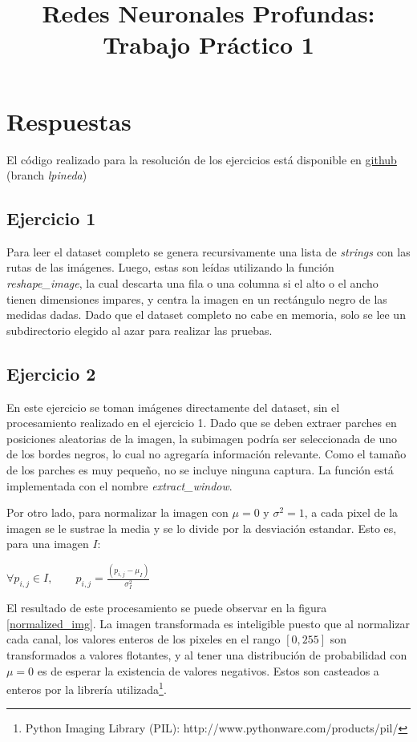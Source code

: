 \documentclass[11pt,spanish]{article}
\begin{document}
\title{Redes Neuronales Profundas: Trabajo Práctico 1}
\date{}
\maketitle

\section*{Respuestas}
El código realizado para la resolución de los ejercicios está disponible en \href{https://github.com/dncampo/deep-learning/tree/lpineda}{github} (branch \textit{lpineda})

\subsection*{Ejercicio 1}
Para leer el dataset completo se genera recursivamente una lista de \textit{strings} con las rutas de las imágenes. Luego, estas son leídas utilizando la función \textit{reshape\_image}, la cual descarta una fila o una columna si el alto o el ancho tienen dimensiones impares, y centra la imagen en un rectángulo negro de las medidas dadas.
Dado que el dataset completo no cabe en memoria, solo se lee un subdirectorio elegido al azar para realizar las pruebas.

\subsection*{Ejercicio 2}
En este ejercicio se toman imágenes directamente del dataset, sin el procesamiento realizado en el ejercicio 1. Dado que se deben extraer parches en posiciones aleatorias de la imagen, la subimagen podría ser seleccionada de uno de los bordes negros, lo cual no agregaría información relevante. Como el tamaño de los parches es muy pequeño, no se incluye ninguna captura. La función está implementada con el nombre \textit{extract\_window}.

Por otro lado, para normalizar la imagen con $\mu=0$ y $\sigma^2=1$, a cada pixel de la imagen se le sustrae la media y se lo divide por la desviación estandar. Esto es, para una imagen $I$: 

\begin{center}
	\begin{math}
	\forall p_{i,j} \in I, \qquad \hat{p}_{i,j} = \frac{(p_{i,j} - \mu_I)}{\sigma^2_I}
	\end{math}
\end{center}

El resultado de este procesamiento se puede observar en la figura \ref{normalized_img}. La imagen transformada es inteligible puesto que al normalizar cada canal, los valores enteros de los pixeles en el rango $[0,255]$ son transformados a valores flotantes, y al tener una distribución de probabilidad con $\mu=0$ es de esperar la existencia de valores negativos. Estos son casteados a enteros por la librería utilizada\footnote{Python Imaging Library (PIL): http://www.pythonware.com/products/pil/}. \par
\end{document}
